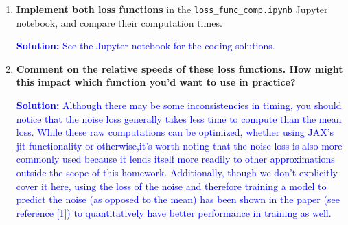 \documentclass{article}
\begin{document}
\begin{enumerate}
    \item
        \textbf{Implement both loss functions} in the \verb|loss_func_comp.ipynb| Jupyter notebook, and compare their computation times.
        
    \textcolor{blue}{
        \textbf{Solution: } See the Jupyter notebook for the coding solutions.
    }
        
    \item
        \textbf{Comment on the relative speeds of these loss functions. How might this impact which function you'd want to use in practice?}

    \textcolor{blue}{
        \textbf{Solution: } Although there may be some inconsistencies in timing, you should notice that the noise loss generally takes less time to compute than the mean loss. While these raw computations can be optimized, whether using JAX's jit functionality or otherwise,it's worth noting that the noise loss is also more commonly used because it lends itself more readily to other approximations outside the scope of this homework. Additionally, though we don't explicitly cover it here, using the loss of the noise and therefore training a model to predict the noise (as opposed to the mean) has been shown in the paper (see reference [1]) to quantitatively have better performance in training as well.
    }
\end{enumerate}
\end{document}
